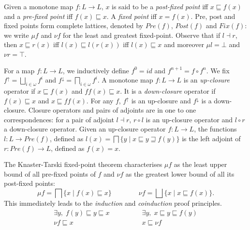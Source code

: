 \documentclass[smallcondensed,envcountsect,envcountsame]{svjour3}     %
\begin{document}
Given a monotone map $f\colon L\to L$, $x$ is said to be a \emph{post-fixed point} iff  $x\sqsubseteq f(x)$ and a \emph{pre-fixed point} iff $f(x)\sqsubseteq x$. A \emph{fixed point} iff $x=f(x)$. Pre, post and fixed points form complete lattices, denoted by $Pre(f)$, $Post(f)$ and $Fix(f)$: we write $\mu f$ and $\nu f$ for the least and greatest fixed-point. Observe that if $l\dashv r$, then $x\sqsubseteq r(x)$ iff $l(x)\sqsubseteq l(r(x))$ iff $l(x)\sqsubseteq x$ and moreover $\mu l = \bot$ and $\nu r = \top$.


For a map $f\colon L \to L$, we inductively define $f^0=id$ and $f^{n+1}=f\circ f^n$. We fix $f^\uparrow = \bigsqcup_{i\in \omega} f^i$ and $f^\downarrow = \bigsqcap_{i\in \omega} f^i$. A monotone map $f\colon L \to L$ is an \emph{up-closure} operator if $x\sqsubseteq f(x)$ and $ff(x) \sqsubseteq x$. It is a \emph{down-closure} operator if $f(x)\sqsubseteq x$ and $x \sqsubseteq ff(x)$. For any $f$, $f^\uparrow$ is an up-closure and $f^\downarrow$ is a down-closure. Closure operators and pairs of adjoints are in one to one correspondences: for a pair of adjoint $l\dashv r$, $r\circ l$ is an up-closure operator and $l\circ r$ a down-closure operator. Given an up-closure operator $f\colon L\to L$, the functions $l\colon L \to Pre(f)$, defined as $l(x) = \bigsqcap \{y \mid x\sqsubseteq y \sqsupseteq f(y) \}$ is the left adjoint of $r\colon Pre(f) \to L$, defined as $f(x)=x$.

\medskip

The Knaster-Tarski fixed-point theorem characterises $\mu f$ as the least upper bound of all pre-fixed points of $f$ and $\nu f$ as the
greatest lower bound of all its post-fixed points:
\begin{equation}\label{eq:KNfpthm}
\mu f= \bigsqcap \{ x  \mid f(x) \sqsubseteq x \} \qquad \qquad \nu f= \bigsqcup \{ x  \mid x \sqsubseteq f(x) \}\text{.}\end{equation} This immediately leads to the
\emph{induction} and \emph{coinduction} proof principles.
\begin{equation}\label{eq:coinductionproofprinciple}\begin{array}{c}
    \exists y, \;  f(y)\sqsubseteq y \sqsubseteq x\\
    \hline \hline %
    \nu f \sqsubseteq x
\end{array}
\qquad
\qquad
\begin{array}{c}
    \exists y, \; x \sqsubseteq y\sqsubseteq f(y)\\
    \hline \hline %
    x \sqsubseteq \nu f
\end{array}
\end{equation}
\end{document}
